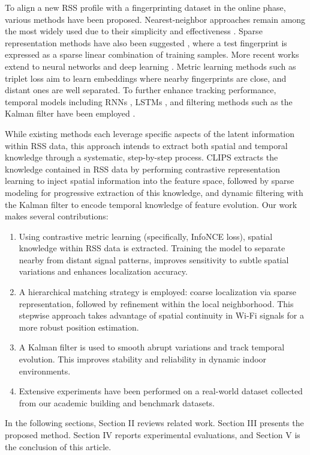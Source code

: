 \documentclass[journal,twoside,web]{ieeecolor}
\begin{document}
To align a new RSS profile with a fingerprinting dataset in the online phase, various methods have been proposed. Nearest-neighbor approaches remain among the most widely used due to their simplicity and effectiveness \cite{Bahl2000,RLWKNN,BMR_KNN}. Sparse representation methods have also been suggested \cite{SR2,STSR}, where a test fingerprint is expressed as a sparse linear combination of training samples.
More recent works extend to neural networks and deep learning \cite{Panja2024,Lan2022}. Metric learning methods such as triplet loss \cite{Triplet1,Triplet2} aim to learn embeddings where nearby fingerprints are close, and distant ones are well separated. To further enhance tracking performance, temporal models including RNNs \cite{RNN2}, LSTMs  \cite{LSTM1}, and filtering methods such as the Kalman filter have been employed \cite{PKF,EKF2,UKF2}.

While existing methods each leverage specific aspects of the latent information within RSS data, this approach intends  to  extract both spatial and temporal knowledge through a systematic, step-by-step process. CLIPS extracts the knowledge contained in RSS data by performing contrastive representation learning to inject spatial information into the feature space, followed by sparse modeling for progressive extraction of this knowledge, and dynamic filtering with the Kalman filter to encode temporal knowledge of feature evolution. Our work makes several contributions:
\begin{enumerate}
    \item  
    Using contrastive metric learning (specifically, InfoNCE loss), spatial knowledge within RSS data is extracted. Training the model to separate nearby from distant signal patterns, improves sensitivity to subtle spatial variations and enhances localization accuracy.
    \item 
    A hierarchical matching strategy is employed: coarse localization via sparse representation, followed by refinement within the local neighborhood. This stepwise approach takes advantage of spatial continuity in Wi-Fi signals for a more robust position estimation.  
    \item  
    A Kalman filter is used to smooth abrupt variations and track temporal evolution. This improves stability and reliability in dynamic indoor environments. 
    \item 
    Extensive experiments have been  performed on a real-world dataset collected from our academic building and benchmark datasets.
\end{enumerate}
In the following sections, Section II reviews related work. Section III presents the proposed method. Section IV reports experimental evaluations, and Section V is the conclusion of this article.
\end{document}
